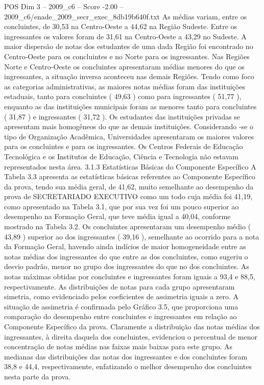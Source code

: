 \begin{textsample}{POS Dim 3 – 2009\_c6 – Score -2.00 – 2009\_c6/enade\_2009\_secr\_exec\_8db19b640f.txt}
As médias variam, entre os concluintes, de 30,53 na Centro-Oeste a 44,62 na Região Sudeste.
Entre os ingressantes os valores foram de 31,61 na Centro-Oeste a 43,29 no Sudeste.
A maior dispersão de notas dos estudantes de uma dada Região foi encontrado no Centro-Oeste para os concluintes e no Norte para os ingressantes.
Nas Regiões Norte e Centro-Oeste os concluintes apresentaram médias menores do que os ingressantes, a situação inversa aconteceu nas demais Regiões.
Tendo como foco as categorias administrativas, as maiores notas médias foram das instituições estaduais, tanto para concluintes ( 49,63 ) como para ingressantes ( 51,77 ), enquanto as das instituições municipais foram as menores tanto para concluintes ( 31,87 ) e ingressantes ( 31,72 ).
Os estudantes das instituições privadas se apresentam mais homogêneos do que as demais instituições.
Considerando -se o tipo de Organização Acadêmica, Universidades apresentaram os maiores valores para os concluintes e para os ingressantes.
Os Centros Federais de Educação Tecnológica e os Institutos de Educação, Ciência e Tecnologia não estavam representados nesta área. 3.1.3 Estatísticas Básicas do Componente Específico A Tabela 3.3 apresenta as estatísticas básicas referentes ao Componente Específico da prova, tendo sua média geral, de 41,62, muito semelhante ao desempenho da prova de SECRETARIADO EXECUTIVO como um todo cuja média foi 41,19, como apresentado na Tabela 3.1, que por sua vez foi um pouco superior ao desempenho na Formação Geral, que teve média igual a 40,04, conforme mostrado na Tabela 3.2.
Os concluintes apresentaram um desempenho médio ( 43,89 ) superior ao dos ingressantes ( 39,16 ), semelhante ao ocorrido para a nota da Formação Geral, havendo ainda indícios de maior homogeneidade entre as notas médias dos ingressantes do que entre as dos concluintes, como sugeriu o desvio padrão, menor no grupo dos ingressantes do que no dos concluintes.
As notas máximas obtidas por concluintes e ingressantes foram iguais a 93,4 e 88,5, respectivamente.
As distribuições de notas para cada grupo apresentaram simetria, como evidenciado pelos coeficientes de assimetria iguais a zero.
A situação de assimetria é confirmada pelo Gráfico 3.5, que proporciona uma comparação do desempenho entre concluintes e ingressantes em relação ao Componente Específico da prova.
Claramente a distribuição das notas médias dos ingressantes, à direita daquela dos concluintes, evidenciou o percentual de menor concentração de notas médias nas faixas mais baixas para este grupo.
As medianas das distribuições das notas dos ingressantes e dos concluintes foram 38,8 e 44,4, respectivamente, enfatizando o melhor desempenho dos concluintes nesta parte da prova.

\end{textsample}
